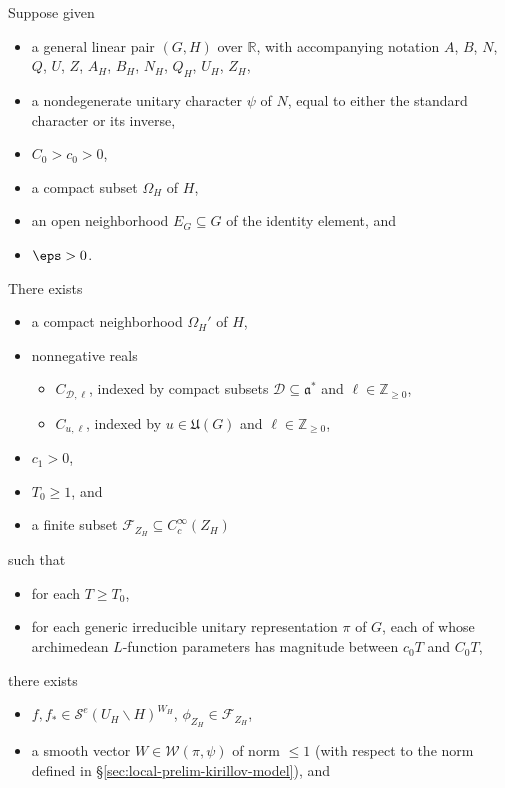 \begin{theorem}\label{thm:construction-vectors-original}
  Suppose given
  \begin{itemize}
  \item a general linear pair $(G,H)$ over $\mathbb{R}$, with accompanying notation $A$, $B$, $N$, $Q$, $U$, $Z$, $A_H$, $B_H$, $N_H$, $Q_H$, $U_H$, $Z_H$,
  \item a nondegenerate unitary character $\psi$ of $N$, equal to either the standard character or its inverse,
  \item $C_0 > c_0 > 0$,
  \item a compact subset $\Omega_H$ of $H$,
  \item an open neighborhood $E_G \subseteq G$ of the identity element, and
  \item $\eps > 0$.
  \end{itemize}
  There exists
  \begin{itemize}
  \item a compact neighborhood $\Omega_H '$ of $H$,
  \item nonnegative reals
    \begin{itemize}
    \item $C_{\mathcal{D},\ell}$, indexed by compact subsets $\mathcal{D} \subseteq \mathfrak{a}^*$ and $\ell \in \mathbb{Z}_{\geq 0}$,
    \item $C_{u, \ell}$, indexed by $u \in \mathfrak{U}(G)$ and $\ell \in \mathbb{Z}_{\geq 0}$,
    \end{itemize}
  \item $c_1 > 0$,
  \item $T_0 \geq 1$, and
  \item a finite subset $\mathcal{F}_{Z_H} \subseteq C_c^\infty(Z_H)$
  \end{itemize}
  such that
  \begin{itemize}
  \item for each $T \geq T_0$,
  \item for each generic irreducible unitary representation $\pi$ of $G$, each of whose archimedean $L$-function parameters has magnitude between $c_0 T$ and $C_0 T$,
  \end{itemize}
  there exists
  \begin{itemize}
  \item $f, f_{\ast} \in \mathcal{S}^e(U_H \backslash H)^{W_H}$, $\phi_{Z_H} \in \mathcal{F}_{Z_H}$,
  \item a smooth vector $W \in \mathcal{W}(\pi,\psi)$ of norm $\leq 1$ (with respect to the norm defined in \S\ref{sec:local-prelim-kirillov-model}), and

\end{itemize}
\end{theorem}

